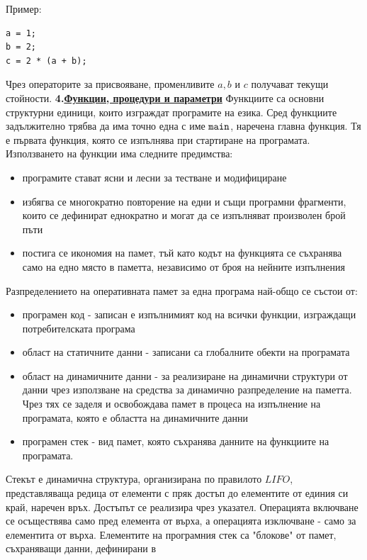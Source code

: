 \documentclass{article}
\begin{document}
Пример:
\begin{lstlisting}[style=cpp]
a = 1;
b = 2;
c = 2 * (a + b);
\end{lstlisting}
Чрез операторите за присвояване, променливите $a, b$ и $c$ получават текущи стойности. \newline\newline
\textbf{4.\underline{Функции, процедури и параметри}} \newline\newline
Функциите са основни структурни единици, които изграждат програмите на езика. Сред функциите задължително трябва да има точно една
с име $\textcolor{black}{\texttt{main}}$, наречена главна функция. Тя е първата функция, която се изпълнява при стартиране на програмата. Използването на
функции има следните предимства:
\begin{itemize}
    \item програмите стават ясни и лесни за тестване и модифициране
    \item избягва се многократно повторение на едни и същи програмни фрагменти, които се дефинират еднократно и могат да се
    изпълняват произволен брой пъти
    \item постига се икономия на памет, тъй като кодът на функцията се съхранява само на едно място в паметта, независимо от броя
    на нейните изпълнения
\end{itemize}
Разпределението на оперативната памет за една програма най-общо се състои от:
\begin{itemize}
    \item програмен код - записан е изпълнимият код на всички функции, изграждащи потребителската програма
    \item област на статичните данни - записани са глобалните обекти на програмата
    \item област на динамичните данни - за реализиране на динамични структури от данни чрез използване на средства за динамично разпределение
    на паметта. Чрез тях се заделя и освобождава памет в процеса на изпълнение на програмата, която е областта на динамичните данни
    \item програмен стек - вид памет, която съхранява данните на функциите на програмата.
\end{itemize}
Стекът е динамична структура, организирана по правилото $LIFO$, представляваща редица от елементи
с пряк достъп до елементите от единия си край, наречен връх. Достъпът се реализира чрез указател. Операцията включване се осъществява само пред елемента
от върха, а операцията изключване - само за елементита от върха. Елементите на програмния стек са "блокове" от памет, съхраняващи данни, дефинирани в
\end{document}
